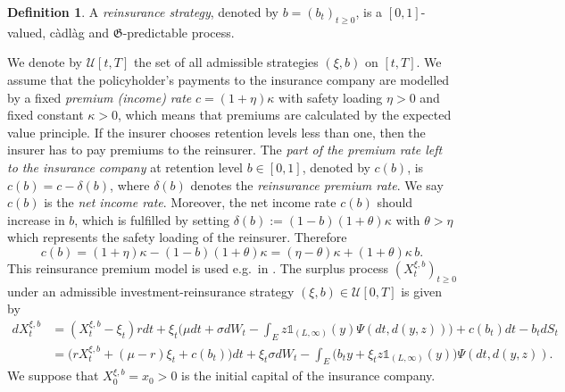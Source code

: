\documentclass[reqno, 11pt]{amsart}%
\newcommand{\xib}{(\xi,b)}
\theoremstyle{definition}
\newtheorem{definition}[theorem]{Definition}
\numberwithin{equation}{section} \numberwithin{theorem}{section}
\begin{document}
\begin{definition}\label{def:reinsurance}
	A \emph{reinsurance strategy}, denoted by $b=(b_t)_{t\ge0}$, is a $[0,1]$-valued, c\`{a}dl\`{a}g and ${\mathfrak G}$-predictable process. 
\end{definition}
We denote by ${\mathcal U}[t,T]$ the set of all admissible strategies $(\xi,b)$ on $[t,T]$. 
We assume that the policyholder's payments to the insurance company are modelled by a fixed \emph{premium (income) rate} $c=(1+\eta)\kappa$ with safety loading $\eta>0$ and fixed constant $\kappa>0$, which means that premiums are calculated by the expected value principle.
If the insurer chooses retention levels less than one, then the insurer has to pay premiums to the reinsurer. The \emph{part of the premium rate left to the insurance company} at retention level $b\in[0,1]$, denoted by $c(b)$, is $c(b) = c - \delta(b)$, where $\delta(b)$ denotes the \emph{reinsurance premium rate}. We say $c(b)$ is the \emph{net income rate}.
Moreover, the net income rate $c(b)$ should increase in $b$, which is fulfilled by setting $\delta(b) :=  (1-b)(1+\theta)\kappa$ with $\theta>\eta$ which represents the safety loading of the reinsurer.
Therefore
\begin{equation}\label{eq:cb}
c(b) = (1+\eta)\kappa - (1-b)(1+\theta)\kappa = (\eta-\theta)\kappa + (1+\theta)\kappa\,b.
\end{equation}
This reinsurance premium model is used e.g.\ in \cite{ZhuShi2019}. 
The surplus process $(X^{\xi,b}_t)_{t\ge0}$ under an admissible investment-reinsurance strategy $\xib\in{\mathcal U}[0,T]$ is given by
\begin{align*}
d X^{\xi,b}_t
&=(X^{\xi,b}_t - \xi_t)r dt + \xi_t\bigg(\mu dt+\sigma dW_t-\int_E z\mathds{1}_{(L,\infty)}(y)\Psi(dt,d(y,z))\bigg) + c(b_t)dt - b_t dS_t  \\
&= \big(rX^{\xi,b}_t + (\mu - r)\xi_t + c(b_t)\big) dt + \xi_t\sigma dW_t - \int_E\big(b_{t}y+ \xi_t z \mathds{1}_{(L,\infty)}(y)\big)\Psi(dt,d(y,z)).
\end{align*}
We suppose that $X^{\xi,b}_0=x_0 >0$  is the initial capital of the insurance company.
\end{document}
